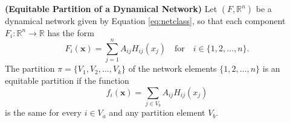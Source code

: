 \documentclass[12pt]{thesis}
\begin{document}



\begin{definition}\textbf{(Equitable Partition of a Dynamical Network)}\label{def:net-eqp}
Let $(F,\mathbb{R}^{n})$ be a dynamical network given by Equation \eqref{eq:netclass}, so that each component $F_i:\mathbb{R}^n\rightarrow\mathbb{R}$ has the form 
\begin{equation}\label{eq:ref}
F_i(\mathbf{x})=\sum_{j=1}^n A_{ij}H_{ij}(x_j) \quad \text{for} \quad i\in\{1,2,\dots,n\}.
\end{equation}
The partition $\pi=\{V_1,V_2,\dots,V_k\}$ of the network elements $\{1,2,\dots,n\}$ is an {equitable partition} if the function    
\begin{equation}\label{eq:DSEP}
f_i(\mathbf{x})=\sum_{j\in V_b}A_{ij}H_{ij}(x_j)
\end{equation}
is the same for every $i\in V_a$ and any partition element $V_b$.
\end{definition}
\end{document}
